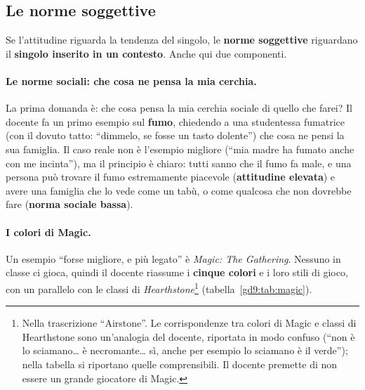 \subsection{Le norme soggettive}

Se l'attitudine riguarda la tendenza del singolo, le \textbf{norme
soggettive} riguardano il \textbf{singolo inserito in un contesto}. Anche qui
due componenti.

\paragraph{Le norme sociali: che cosa ne pensa la mia cerchia.} La prima
domanda è: che cosa pensa la mia cerchia sociale di quello che farei? Il
docente fa un primo esempio sul \textbf{fumo}, chiedendo a una studentessa
fumatrice (con il dovuto tatto: ``dimmelo, se fosse un tasto dolente'') che
cosa ne pensi la sua famiglia. Il caso reale non è l'esempio migliore (``mia
madre ha fumato anche con me incinta''), ma il principio è chiaro: tutti
sanno che il fumo fa male, e una persona può trovare il fumo estremamente
piacevole (\textbf{attitudine elevata}) e avere una famiglia che lo vede come
un tabù, o come qualcosa che non dovrebbe fare (\textbf{norma sociale
bassa}).

\paragraph{I colori di Magic.} Un esempio ``forse migliore, e più legato'' è
\emph{Magic: The Gathering}. Nessuno in classe ci gioca, quindi il docente
riassume i \textbf{cinque colori} e i loro stili di gioco, con un parallelo
con le classi di \emph{Hearthstone}\footnote{Nella trascrizione
``Airstone''. Le corrispondenze tra colori di Magic e classi di Hearthstone
sono un'analogia del docente, riportata in modo confuso (``non è lo
sciamano\ldots{} è necromante\ldots{} sì, anche per esempio lo sciamano è il
verde''); nella tabella si riportano quelle comprensibili. Il docente
premette di non essere un grande giocatore di Magic.}
(tabella~\ref{gd9:tab:magic}).

